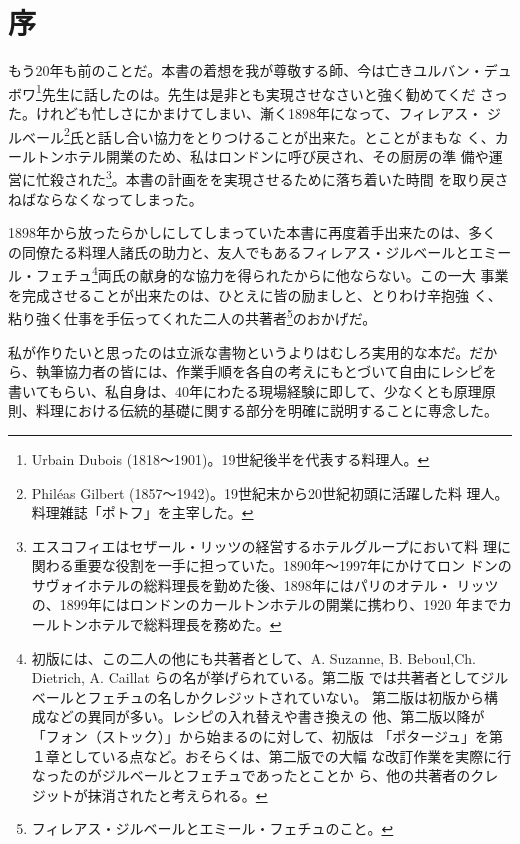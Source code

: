 \documentclass[twoside,12Q,b5paper,tombo]{ltjsbook}
\date{}
\begin{document}
\layout

\section*{序}\label{ux5e8f}

もう20年も前のことだ。本書の着想を我が尊敬する師、今は亡きユルバン・デュ
ボワ\footnote{Urbain Dubois (1818〜1901)。19世紀後半を代表する料理人。}先生に話したのは。先生は是非とも実現させなさいと強く勧めてくだ
さった。けれども忙しさにかまけてしまい、漸く1898年になって、フィレアス・
ジルベール\footnote{Philéas Gilbert
  (1857〜1942)。19世紀末から20世紀初頭に活躍した料
  理人。料理雑誌「ポトフ」を主宰した。}氏と話し合い協力をとりつけることが出来た。とことがまもな
く、カールトンホテル開業のため、私はロンドンに呼び戻され、その厨房の準
備や運営に忙殺された\footnote{エスコフィエはセザール・リッツの経営するホテルグループにおいて料
  理に関わる重要な役割を一手に担っていた。1890年〜1997年にかけてロン
  ドンのサヴォイホテルの総料理長を勤めた後、1898年にはパリのオテル・
  リッツの、1899年にはロンドンのカールトンホテルの開業に携わり、1920
  年までカールトンホテルで総料理長を務めた。}。本書の計画をを実現させるために落ち着いた時間
を取り戻さねばならなくなってしまった。

1898年から放ったらかしにしてしまっていた本書に再度着手出来たのは、多く
の同僚たる料理人諸氏の助力と、友人でもあるフィレアス・ジルベールとエミー
ル・フェチュ\footnote{初版には、この二人の他にも共著者として、A.
  Suzanne, B. Beboul,Ch. Dietrich, A. Caillat
  らの名が挙げられている。第二版
  では共著者としてジルベールとフェチュの名しかクレジットされていない。
  第二版は初版から構成などの異同が多い。レシピの入れ替えや書き換えの
  他、第二版以降が「フォン（ストック）」から始まるのに対して、初版は
  「ポタージュ」を第１章としている点など。おそらくは、第二版での大幅
  な改訂作業を実際に行なったのがジルベールとフェチュであったとことか
  ら、他の共著者のクレジットが抹消されたと考えられる。}両氏の献身的な協力を得られたからに他ならない。この一大
事業を完成させることが出来たのは、ひとえに皆の励ましと、とりわけ辛抱強
く、粘り強く仕事を手伝ってくれた二人の共著者\footnote{フィレアス・ジルベールとエミール・フェチュのこと。}のおかげだ。

私が作りたいと思ったのは立派な書物というよりはむしろ実用的な本だ。だか
ら、執筆協力者の皆には、作業手順を各自の考えにもとづいて自由にレシピを
書いてもらい、私自身は、40年にわたる現場経験に即して、少なくとも原理原
則、料理における伝統的基礎に関する部分を明確に説明することに専念した。
\end{document}
